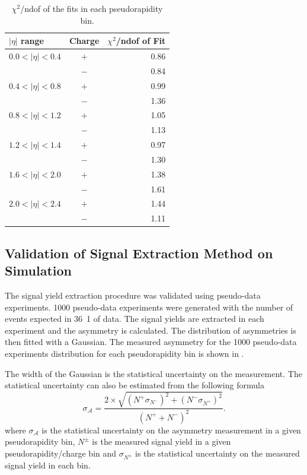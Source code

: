 \begin{table}[htbp]
\begin{center}
\begin{tabular}{lcr}
    \toprule
$|\eta|$ range &Charge & $\chi^2$/ndof of Fit\\
\midrule
$0.0<| \eta |<0.4$ &$+$&  0.86\\
                   &$-$&  0.84\\
$0.4<| \eta |<0.8$ &$+$&  0.99\\
                   &$-$&  1.36\\
$0.8<| \eta |<1.2$ &$+$&  1.05\\
                   &$-$&  1.13\\
$1.2<| \eta |<1.4$ &$+$&  0.97\\
                   &$-$&  1.30\\
$1.6<| \eta |<2.0$ &$+$&  1.38\\
                   &$-$&  1.61\\
$2.0<| \eta |<2.4$ &$+$&  1.44\\
                   &$-$&  1.11\\
    \bottomrule
\end{tabular}
\caption[$\chi^2$/ndof of the fits in each pseudorapidity
bin.]{\label{tab:chi2}$\chi^2$/ndof of the fits in each pseudorapidity
bin\cite{baisini2010electron}.}
\end{center}
\end{table}


\subsection{Validation of Signal Extraction Method on Simulation}

The signal yield extraction procedure was validated using pseudo-data
experiments. 1000 pseudo-data experiments were generated with the number of
events expected in \unit{36.1}{\invpb} of data. The signal yields are extracted
in each experiment and the asymmetry is calculated. The distribution of
asymmetries is then fitted with a Gaussian.
The measured asymmetry for the 1000 pseudo-data experiments distribution for each
pseudorapidity bin is shown in .

The width of the Gaussian is the statistical uncertainty on the measurement.
The statistical uncertainty can also be estimated from the following formula
\begin{equation}
  \label{tab:statuncert}
\sigma_\mathcal{A} = 
\frac{ 
  2 \times \sqrt{ \left( N^+ \sigma_{N^-} \right)^2 + \left( N^- \sigma_{N^+} \right)^2 } 
}
{ 
  \left( N^{+} + N^{-} \right)^2 
} .
\end{equation}
where $\sigma_\mathcal{A}$ is the statistical uncertainty on the asymmetry
measurement in a given pseudorapidity bin, $N^{\pm}$ is the measured signal
yield in a given pseudorapidity/charge bin and $\sigma_{N^\pm}$ is the
statistical uncertainty on the measured signal yield in each bin.


